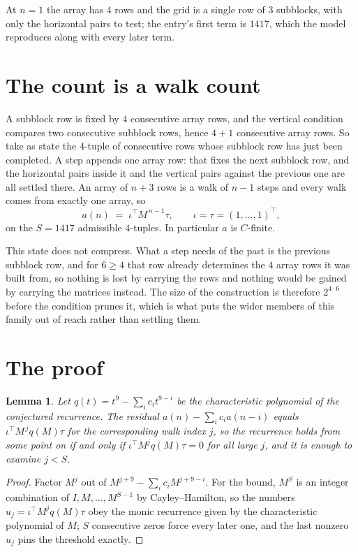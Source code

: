 \documentclass[11pt,a4paper]{article}
\theoremstyle{plain}
\newtheorem{lemma}[theorem]{Lemma}
\theoremstyle{definition}
\begin{document}
At $n=1$ the array has $4$ rows and the grid is a single row of $3$
subblocks, with only the horizontal pairs to test; the entry's first term is
$1417$, which the model reproduces along with every later term.

\section{The count is a walk count}

A subblock row is fixed by $4$ consecutive array rows, and the vertical condition compares
two consecutive subblock rows, hence $4+1$ consecutive array rows. So take as state the
$4$-tuple of consecutive rows whose subblock row has just been completed. A step appends one
array row: that fixes the next subblock row, and the horizontal pairs inside it and the
vertical pairs against the previous one are all settled there. An array of $n+3$ rows is
a walk of $n-1$ steps and every walk comes from exactly one array, so
\[
a(n)\;=\;\iota^{\!\top}M^{\,n-1}\tau,\qquad\iota=\tau=(1,\dots,1)^{\!\top},
\]
on the $S=1417$ admissible $4$-tuples. In particular $a$ is $C$-finite.

This state does not compress. What a step needs of the past is the previous subblock row, and
for $6\ge4$ that row already determines the $4$ array rows it was built from, so nothing
is lost by carrying the rows and nothing would be gained by carrying the matrices instead. The
size of the construction is therefore $2^{4\cdot6}$ before the condition prunes
it, which is what puts the wider members of this family out of reach rather than settling them.

\section{The proof}

\begin{lemma}\label{lem:crit}
Let $q(t)=t^{9}-\sum_i c_it^{9-i}$ be the characteristic polynomial of the
conjectured recurrence. The residual $a(n)-\sum_ic_ia(n-i)$ equals
$\iota^{\!\top}M^{\,j}q(M)\tau$ for the corresponding walk index $j$, so the recurrence
holds from some point on if and only if $\iota^{\!\top}M^{j}q(M)\tau=0$ for all large $j$,
and it is enough to examine $j<S$.
\end{lemma}

\begin{proof}
Factor $M^{j}$ out of $M^{j+9}-\sum_ic_iM^{j+9-i}$. For the bound, $M^{S}$
is an integer combination of $I,M,\dots,M^{S-1}$ by Cayley--Hamilton, so the numbers
$u_j=\iota^{\!\top}M^{j}q(M)\tau$ obey the monic recurrence given by the characteristic
polynomial of $M$; $S$ consecutive zeros force every later one, and the last nonzero $u_j$
pins the threshold exactly.
\end{proof}
\end{document}
